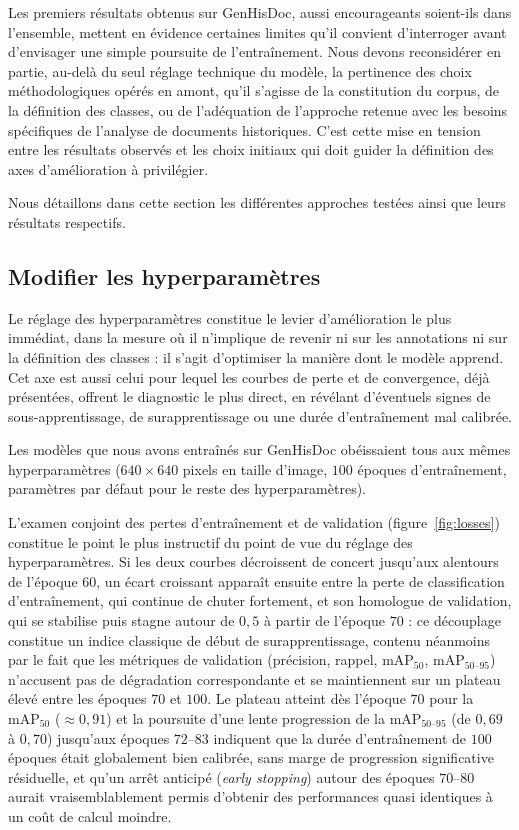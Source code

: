 Les premiers résultats obtenus sur GenHisDoc, aussi encourageants soient-ils dans l'ensemble, mettent en évidence certaines limites qu'il convient d'interroger avant d'envisager une simple poursuite de l'entraînement. Nous devons reconsidérer en partie, au-delà du seul réglage technique du modèle, la pertinence des choix méthodologiques opérés en amont, qu'il s'agisse de la constitution du corpus, de la définition des classes, ou de l'adéquation de l'approche retenue avec les besoins spécifiques de l'analyse de documents historiques. C'est cette mise en tension entre les résultats observés et les choix initiaux qui doit guider la définition des axes d'amélioration à privilégier.

Nous détaillons dans cette section les différentes approches testées ainsi que leurs résultats respectifs.

\subsection{Modifier les hyperparamètres}

Le réglage des hyperparamètres constitue le levier d'amélioration le plus immédiat, dans la mesure où il n'implique de revenir ni sur les annotations ni sur la définition des classes : il s'agit d'optimiser la manière dont le modèle apprend. Cet axe est aussi celui pour lequel les courbes de perte et de convergence, déjà présentées, offrent le diagnostic le plus direct, en révélant d'éventuels signes de sous-apprentissage, de surapprentissage ou une durée d'entraînement mal calibrée.

Les modèles que nous avons entraînés sur GenHisDoc obéissaient tous aux mêmes hyperparamètres ($640 \times 640$ pixels en taille d'image, $100$ époques d'entraînement, paramètres par défaut pour le reste des hyperparamètres).

L'examen conjoint des pertes d'entraînement et de validation (figure~\ref{fig:losses}) constitue le point le plus instructif du point de vue du réglage des hyperparamètres. Si les deux courbes décroissent de concert jusqu'aux alentours de l'époque $60$, un écart croissant apparaît ensuite entre la perte de classification d'entraînement, qui continue de chuter fortement, et son homologue de validation, qui se stabilise puis stagne autour de $0{,}5$ à partir de l'époque $70$ : ce découplage constitue un indice classique de début de surapprentissage, contenu néanmoins par le fait que les métriques de validation (précision, rappel, $\text{mAP}_{50}$, $\text{mAP}_{50\text{--}95}$) n'accusent pas de dégradation correspondante et se maintiennent sur un plateau élevé entre les époques $70$ et $100$. Le plateau atteint dès l'époque $70$ pour la $\text{mAP}_{50}$ ($\approx 0{,}91$) et la poursuite d'une lente progression de la $\text{mAP}_{50\text{--}95}$ (de $0{,}69$ à $0{,}70$) jusqu'aux époques $72\text{--}83$ indiquent que la durée d'entraînement de $100$ époques était globalement bien calibrée, sans marge de progression significative résiduelle, et qu'un arrêt anticipé (\textit{early stopping}) autour des époques $70\text{--}80$ aurait vraisemblablement permis d'obtenir des performances quasi identiques à un coût de calcul moindre.

